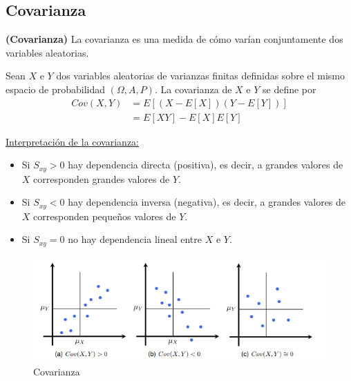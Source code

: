 \documentclass[../main.tex]{subfiles}
\begin{document}
    \subsection{Covarianza}
        \begin{definition}\textbf{(Covarianza)}
            La covarianza es una medida de cómo varían conjuntamente dos variables aleatorias.

            Sean $X$ e $Y$ dos variables aleatorias de varianzas finitas definidas sobre el mismo espacio de probabilidad $(\Omega ,A, P)$. La covarianza de $X$ e $Y$ se define por
            \begin{equation}
                \begin{split}
                    Cov(X,Y) &= E[(X - E[X])(Y - E[Y])] 
                    \\&= E[XY] - E[X]E[Y]
                \end{split}
            \end{equation}

            \underline{Interpretación de la covarianza:}
            \begin{itemize}
                \item Si $S_{xy} > 0$ hay dependencia directa (positiva), es decir, a grandes valores de $X$ corresponden grandes valores de $Y$.
                \item Si $S_{xy} < 0$ hay dependencia inversa (negativa), es decir, a grandes valores de $X$ corresponden pequeños valores de $Y$.
                \item Si $S_{xy} = 0$ no hay dependencia lineal entre $X$ e $Y$.
            \end{itemize}
    
            \begin{figure}[htb]
                \centering
                \includegraphics[scale=0.5]{./images/covarianza.png}
                \caption{Covarianza}
                \label{fig:covarianza}
            \end{figure}
            
        \end{definition}
\end{document}
